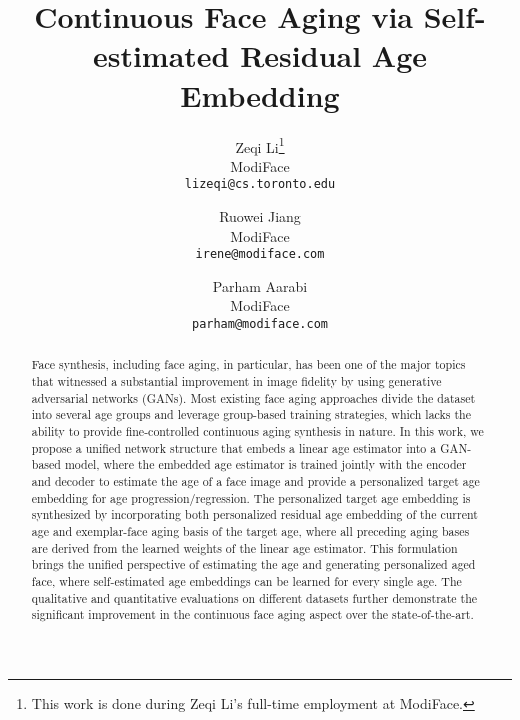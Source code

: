 \documentclass[final]{cvpr}
\begin{document}

\title{Continuous Face Aging via Self-estimated Residual Age Embedding}


\author{Zeqi Li\thanks{This work is done during Zeqi Li’s full-time employment at ModiFace.}\\
ModiFace\\
{\tt\small lizeqi@cs.toronto.edu}
\and
Ruowei Jiang\\
ModiFace\\
{\tt\small irene@modiface.com}
\and
Parham Aarabi\\
ModiFace\\
{\tt\small parham@modiface.com}
}

\maketitle


\begin{abstract}

Face synthesis, including face aging, in particular, has been one of the major topics that witnessed a substantial improvement in image fidelity by using generative adversarial networks (GANs). Most existing face aging approaches divide the dataset into several age groups and leverage group-based training strategies, which lacks the ability to provide fine-controlled continuous aging synthesis in nature. In this work, we propose a unified network structure that embeds a linear age estimator into a GAN-based model, where the embedded age estimator is trained jointly with the encoder and decoder to estimate the age of a face image and provide a personalized target age embedding for age progression/regression. The personalized target age embedding is synthesized by incorporating both personalized residual age embedding of the current age and exemplar-face aging basis of the target age, where all preceding aging bases are derived from the learned weights of the linear age estimator. This formulation brings the unified perspective of estimating the age and generating personalized aged face, where self-estimated age embeddings can be learned for every single age. The qualitative and quantitative evaluations on different datasets further demonstrate the significant improvement in the continuous face aging aspect over the state-of-the-art.
\end{abstract}
\end{document}
